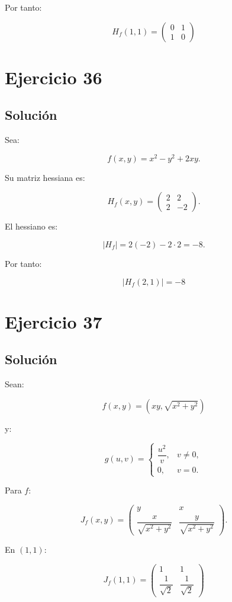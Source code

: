\documentclass[11pt,a4paper]{article}
\begin{document}
Por tanto:

\[
\boxed{
H_f(1,1)
=
\begin{pmatrix}
0&1\\
1&0
\end{pmatrix}
}
\]

\section{Ejercicio 36}
\subsection{Solución}

Sea:

\[
f(x,y)
=
x^2-y^2+2xy.
\]

Su matriz hessiana es:

\[
H_f(x,y)
=
\begin{pmatrix}
2&2\\
2&-2
\end{pmatrix}.
\]

El hessiano es:

\[
|H_f|
=
2(-2)-2\cdot2
=
-8.
\]

Por tanto:

\[
\boxed{
|H_f(2,1)|=-8
}
\]

\section{Ejercicio 37}
\subsection{Solución}

Sean:

\[
f(x,y)
=
\left(
xy,
\sqrt{x^2+y^2}
\right)
\]

y:

\[
g(u,v)
=
\begin{cases}
\dfrac{u^2}{v},&v\neq0,\\[2mm]
0,&v=0.
\end{cases}
\]

Para \(f\):

\[
J_f(x,y)
=
\begin{pmatrix}
y&x\\[1mm]
\dfrac{x}{\sqrt{x^2+y^2}}&
\dfrac{y}{\sqrt{x^2+y^2}}
\end{pmatrix}.
\]

En \((1,1)\):

\[
\boxed{
J_f(1,1)
=
\begin{pmatrix}
1&1\\
\dfrac1{\sqrt2}&\dfrac1{\sqrt2}
\end{pmatrix}
}
\]
\end{document}
